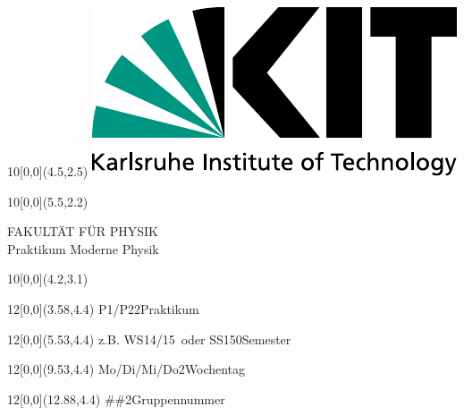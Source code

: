 \newcommand{\diameter}{20}
\newcommand{\xone}{-15}
\newcommand{\xtwo}{160}
\newcommand{\yone}{15}
\newcommand{\ytwo}{-253}

\newcommand{\hoehea}{60}
\newcommand{\hoeheb}{60}




\begin{titlepage}

    \begin{textblock}{10}[0,0](4.5,2.5)
        \includegraphics[width=.25\textwidth]{00-include/kitlogo.pdf}
    \end{textblock}
    \begin{textblock}{10}[0,0](5.5,2.2)
        \begin{flushright}
            \Large FAKULTÄT FÜR PHYSIK\\Praktikum Moderne Physik
        \end{flushright}
    \end{textblock}

    \begin{textblock}{10}[0,0](4.2,3.1)
    \end{textblock}

    \Large
    \begin{textblock}{12}[0,0](3.58,4.4)
                    {P1/P2}{2}{Praktikum}
    \end{textblock}
    \begin{textblock}{12}[0,0](5.53,4.4)
        {z.B. \glqq WS14/15\grqq\ oder \glqq SS15\grqq}{0}{Semester}
    \end{textblock}
    \begin{textblock}{12}[0,0](9.53,4.4)
                    {Mo/Di/Mi/Do}{2}{Wochentag}
    \end{textblock}
    \begin{textblock}{12}[0,0](12.88,4.4)
                   {\#\#}{2}{Gruppennummer}
    \end{textblock}


\end{titlepage}
